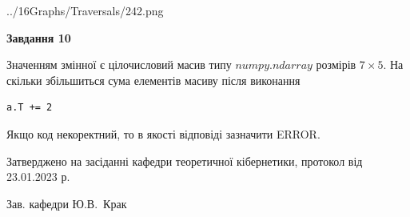 \documentclass[12pt, ukrainian]{article}
\begin{document}
{\begin {large}
\begin{center}
	{../16Graphs/Traversals/242.png}
\end{center}\par
\newpage

{\begin {center}\textbf{Завдання 10}\end {center}}\par
Значенням змінної  є цілочисловий масив типу $numpy.ndarray$ розмірів $7{\times}5$. На скільки збільшиться сума елементів масиву  після виконання
\begin{verbatim}
a.T += 2
\end{verbatim}


Якщо код некоректний, то в якості відповіді зазначити ERROR.\par
\newpage


\end {large}
}
{\smallskip \begin {small} Затверджено на засіданні кафедри теоретичної кібернетики, протокол  від   23.01.2023 р.\par\smallskip\smallskip
{\parbox {6.5 cm}{Зав. кафедри \dotfill Ю.В.~Крак}} \end{small}}
\end{document}
